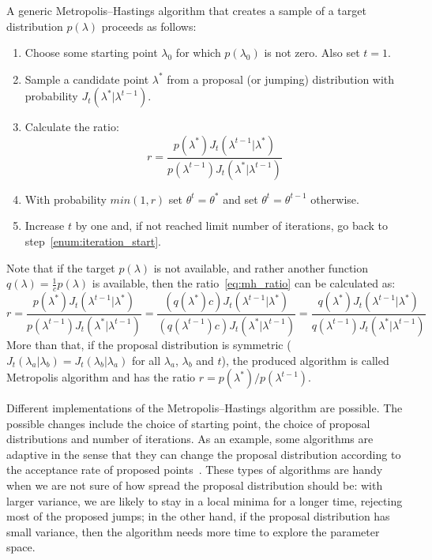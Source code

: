 A generic Metropolis--Hastings algorithm that creates a sample of a 
target distribution $p (\lambda)$ proceeds as follows:
\begin{enumerate}
\item{Choose some starting point $\lambda_0$ for which $p (\lambda_0)$ 
    is not zero. Also set $t = 1$.}
\item{Sample a candidate point $\lambda^*$ from a proposal (or jumping) 
    distribution with probability $J_t (\lambda^* | \lambda^{t - 1})$.}
    \label{enum:iteration_start}
\item{Calculate the ratio:}
    \begin{equation}
        r = \frac{p (\lambda^*) J_t (\lambda^{t - 1} | \lambda^*)}
                 {p (\lambda^{t - 1}) J_t (\lambda^* | \lambda^{t - 1})}
        \label{eq:mh_ratio}
    \end{equation}
\item{With probability $min (1, r)$ set $\theta^t = \theta^*$ and set
    $\theta^t = \theta^{t - 1}$ otherwise.}
\item{Increase $t$ by one and, if not reached limit number of 
    iterations, go back to step~\ref{enum:iteration_start}.}
\end{enumerate}
Note that if the target $p (\lambda)$ is not available, and rather 
another function $q (\lambda) = \frac{1}{c}p(\lambda)$ is available, 
then the ratio~\ref{eq:mh_ratio} can be calculated as:
\begin{equation}
    r = \frac{p (\lambda^*) J_t (\lambda^{t - 1} | \lambda^*)}
              {p (\lambda^{t - 1}) J_t (\lambda^* | \lambda^{t - 1})} 
      = \frac{(q (\lambda^*)c) J_t (\lambda^{t - 1} | \lambda^*)}
           {(q (\lambda^{t - 1})c) J_t (\lambda^* | \lambda^{t - 1})} 
      = \frac{q (\lambda^*) J_t (\lambda^{t - 1} | \lambda^*)}
              {q (\lambda^{t - 1}) J_t (\lambda^* | \lambda^{t - 1})}
\end{equation}
More than that, if the proposal distribution is symmetric 
($J_t(\lambda_a|\lambda_b) = J_t(\lambda_b|\lambda_a)$ for all 
$\lambda_a$, $\lambda_b$ and $t$), the produced algorithm is called 
Metropolis algorithm and has the ratio 
$r = {p (\lambda^*)}/{p (\lambda^{t - 1})}$. 

Different implementations of the Metropolis--Hastings algorithm are 
possible. The possible changes include the choice of starting point,
the choice of proposal distributions and number of iterations. As an
example, some algorithms are adaptive in the sense that they can change 
the proposal distribution according to the acceptance rate of proposed 
points~\cite{Gelman2013}. These types of algorithms are handy when we
are not sure of how spread the proposal distribution should be: with
larger variance, we are likely to stay in a local minima for a longer 
time, rejecting most of the proposed jumps; in the other hand, if the 
proposal distribution has small variance, then the algorithm needs more
time to explore the parameter space.
